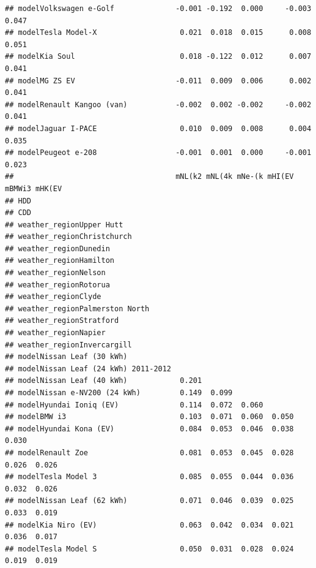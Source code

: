 \documentclass[
]{article}
\begin{document}
\begin{verbatim}
## modelVolkswagen e-Golf              -0.001 -0.192  0.000     -0.003  0.047
## modelTesla Model-X                   0.021  0.018  0.015      0.008  0.051
## modelKia Soul                        0.018 -0.122  0.012      0.007  0.041
## modelMG ZS EV                       -0.011  0.009  0.006      0.002  0.041
## modelRenault Kangoo (van)           -0.002  0.002 -0.002     -0.002  0.041
## modelJaguar I-PACE                   0.010  0.009  0.008      0.004  0.035
## modelPeugeot e-208                  -0.001  0.001  0.000     -0.001  0.023
##                                     mNL(k2 mNL(4k mNe-(k mHI(EV mBMWi3 mHK(EV
## HDD                                                                          
## CDD                                                                          
## weather_regionUpper Hutt                                                     
## weather_regionChristchurch                                                   
## weather_regionDunedin                                                        
## weather_regionHamilton                                                       
## weather_regionNelson                                                         
## weather_regionRotorua                                                        
## weather_regionClyde                                                          
## weather_regionPalmerston North                                               
## weather_regionStratford                                                      
## weather_regionNapier                                                         
## weather_regionInvercargill                                                   
## modelNissan Leaf (30 kWh)                                                    
## modelNissan Leaf (24 kWh) 2011-2012                                          
## modelNissan Leaf (40 kWh)            0.201                                   
## modelNissan e-NV200 (24 kWh)         0.149  0.099                            
## modelHyundai Ioniq (EV)              0.114  0.072  0.060                     
## modelBMW i3                          0.103  0.071  0.060  0.050              
## modelHyundai Kona (EV)               0.084  0.053  0.046  0.038  0.030       
## modelRenault Zoe                     0.081  0.053  0.045  0.028  0.026  0.026
## modelTesla Model 3                   0.085  0.055  0.044  0.036  0.032  0.026
## modelNissan Leaf (62 kWh)            0.071  0.046  0.039  0.025  0.033  0.019
## modelKia Niro (EV)                   0.063  0.042  0.034  0.021  0.036  0.017
## modelTesla Model S                   0.050  0.031  0.028  0.024  0.019  0.019

\end{verbatim}
\end{document}
